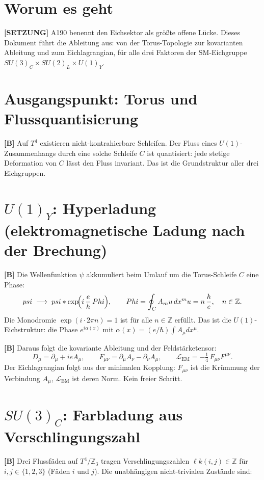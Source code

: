 \section{Worum es geht}

\textbf{[SETZUNG]} A190 benennt den Eichsektor als größte offene Lücke.
Dieses Dokument führt die Ableitung aus: von der Torus-Topologie zur
kovarianten Ableitung und zum Eichlagrangian, für alle drei Faktoren der
SM-Eichgruppe $SU(3)_C\times SU(2)_L\times U(1)_Y$.

\section{Ausgangspunkt: Torus und Flussquantisierung}

\textbf{[B]} Auf $T^4$ existieren nicht-kontrahierbare Schleifen. Der Fluss
eines $U(1)$-Zusammenhangs durch eine solche Schleife $C$ ist quantisiert:
jede stetige Deformation von $C$ lässt den Fluss invariant. Das ist die
Grundstruktur aller drei Eichgruppen.

\section{$U(1)_Y$: Hyperladung (elektromagnetische Ladung nach der Brechung)}

\textbf{[B]} Die Wellenfunktion $\psi$ akkumuliert beim Umlauf um die
Torus-Schleife $C$ eine Phase:
\[
  \psi \;\longrightarrow\; \psi\cdot\exp\!\Bigl(i\,\frac{e}{\hbar}\,\Phi\Bigr),
  \qquad \Phi = \oint_C A_\mu\,dx^\mu = n\,\frac{h}{e},\quad n\in\mathbb{Z}.
\]
Die Monodromie $\exp(i\cdot 2\pi n)=1$ ist für alle $n\in\mathbb{Z}$ erfüllt.
Das ist die $U(1)$-Eichstruktur: die Phase $e^{i\alpha(x)}$ mit
$\alpha(x) = (e/\hbar)\int A_\mu dx^\mu$.

\textbf{[B]} Daraus folgt die kovariante Ableitung und der Feldstärketensor:
\[
  D_\mu = \partial_\mu + ieA_\mu,
  \qquad
  F_{\mu\nu} = \partial_\mu A_\nu - \partial_\nu A_\mu,
  \qquad
  \mathcal{L}_\text{EM} = -\tfrac14\,F_{\mu\nu}F^{\mu\nu}.
\]
Der Eichlagrangian folgt aus der minimalen Kopplung: $F_{\mu\nu}$ ist die
Krümmung der Verbindung $A_\mu$, $\mathcal{L}_\text{EM}$ ist deren
Norm. Kein freier Schritt.

\section{$SU(3)_C$: Farbladung aus Verschlingungszahl}

\textbf{[B]} Drei Flussfäden auf $T^4/\mathbb{Z}_3$ tragen Verschlingungszahlen
$\ell k(i,j)\in\mathbb{Z}$ für $i,j\in\{1,2,3\}$ (Fäden $i$ und $j$).
Die unabhängigen nicht-trivialen Zustände sind:


